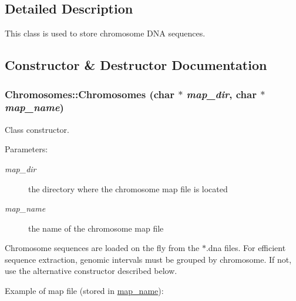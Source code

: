 \subsection{Detailed Description}
This class is used to store chromosome DNA sequences. 

\subsection{Constructor \& Destructor Documentation}
\hypertarget{classChromosomes_a596430d4a05ce0dc4d4f43c650db83e}{
\subsubsection[Chromosomes]{\setlength{\rightskip}{0pt plus 5cm}Chromosomes::Chromosomes (char $\ast$ {\em map\_\-dir}, \/  char $\ast$ {\em map\_\-name})}}
\label{classChromosomes_a596430d4a05ce0dc4d4f43c650db83e}


Class constructor. 

\begin{Desc}
\item[Parameters:]
\begin{description}
\item[{\em map\_\-dir}]the directory where the chromosome map file is located \item[{\em map\_\-name}]the name of the chromosome map file\end{description}
\end{Desc}
Chromosome sequences are loaded on the fly from the $\ast$.dna files. For efficient sequence extraction, genomic intervals must be grouped by chromosome. If not, use the alternative constructor described below.

Example of map file (stored in \hyperlink{classChromosomes_9c690f19e04e80b056dac2072476f24c}{map\_\-name}):

